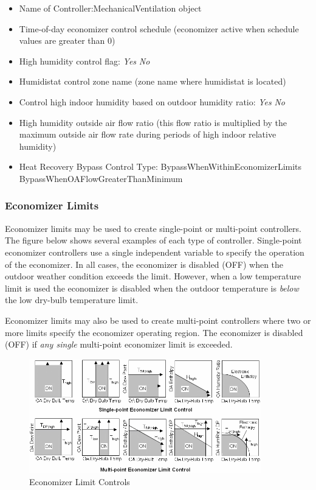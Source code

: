 \begin{itemize}
\item
  Name of Controller:MechanicalVentilation object
\item
  Time-of-day economizer control schedule (economizer active when schedule values are greater than 0)
\item
  High humidity control flag: \emph{Yes} \textbar{} \emph{No}
\item
  Humidistat control zone name (zone name where humidistat is located)
\item
  Control high indoor humidity based on outdoor humidity ratio: \emph{Yes} \textbar{} \emph{No}
\item
  High humidity outside air flow ratio (this flow ratio is multiplied by the maximum outside air flow rate during periods of high indoor relative humidity)
\item
  Heat Recovery Bypass Control Type: BypassWhenWithinEconomizerLimits \textbar{} BypassWhenOAFlowGreaterThanMinimum
\end{itemize}

\subsubsection{Economizer Limits}\label{economizer-limits}

Economizer limits may be used to create single-point or multi-point controllers. The figure below shows several examples of each type of controller. Single-point economizer controllers use a single independent variable to specify the operation of the economizer. In all cases, the economizer is disabled (OFF) when the outdoor weather condition exceeds the limit. However, when a low temperature limit is used the economizer is disabled when the outdoor temperature is \emph{below} the low dry-bulb temperature limit.

Economizer limits may also be used to create multi-point controllers where two or more limits specify the economizer operating region. The economizer is disabled (OFF) if \emph{any single} multi-point economizer limit is exceeded.

\begin{figure}[hbtp] %
\centering
\includegraphics[width=0.9\textwidth, height=0.9\textheight, keepaspectratio=true]{media/image4411.png}
\caption{Economizer Limit Controls \protect \label{fig:economizer-limit-controls}}
\end{figure}

